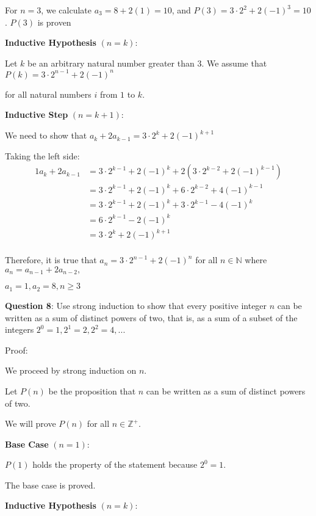 \documentclass{article} %
\newcommand{\question}[2][]{\begin{flushleft}
        \textbf{Question #1}: #2

\end{flushleft}}
\begin{document}
    For $n = 3$, we calculate $a_3 = 8 + 2(1) = 10$, and $P(3) = 3 \cdot 2^2 + 2(-1)^3 = 10$. $P(3)$ is proven

    \textbf{Inductive Hypothesis} $(n = k)$:

    Let $k$ be an arbitrary natural number greater than 3. We assume that $P(k) = 3 \cdot 2^{n - 1} + 2(-1)^n$

    for all natural numbers $i$ from $1$ to $k$.

    \textbf{Inductive Step} $(n = k + 1)$:

    We need to show that $a_{k} + 2a_{k - 1} = 3 \cdot 2^{k} + 2(-1)^{k + 1}$

    Taking the left side:
    \begin{alignat*}{1}
        a_{k} + 2a_{k - 1} &= 3 \cdot 2^{k - 1} + 2(-1)^k + 2(3 \cdot 2^{k - 2} + 2(-1)^{k - 1})\\
        &= 3 \cdot 2^{k - 1} + 2(-1)^k + 6 \cdot 2^{k - 2} + 4(-1)^{k - 1}\\
        &= 3 \cdot 2^{k - 1} + 2(-1)^{k} + 3 \cdot 2^{k - 1} - 4(-1)^{k}\\
        &= 6 \cdot 2^{k - 1} - 2(-1)^{k}\\
        &= 3 \cdot 2^{k} + 2(-1)^{k + 1}\\
    \end{alignat*}

    Therefore, it is true that $a_n = 3 \cdot 2^{n - 1} + 2(-1)^n$ for all $n \in \mathbb{N}$ where $a_n = a_{n - 1} + 2a_{n-2},$
    
    $a_1 = 1, a_2 = 8, n \geq 3$

    \newpage

    \question[8]{Use strong induction to show that every positive integer $n$ can be written as a sum
    of distinct powers of two, that is, as a sum of a subset of the integers $2^0 = 1, 2^1 = 2, 2^2 = 4, ...$}

    Proof:

    We proceed by strong induction on $n$.

    Let $P(n)$ be the proposition that $n$ can be written as a sum of distinct powers of two.

    We will prove $P(n)$ for all $n \in \mathbb{Z}^+$.

    \textbf{Base Case} $(n = 1)$:

    $P(1)$ holds the property of the statement because $2^0 = 1$.

    The base case is proved.

    \textbf{Inductive Hypothesis} $(n = k)$:
\end{document}
